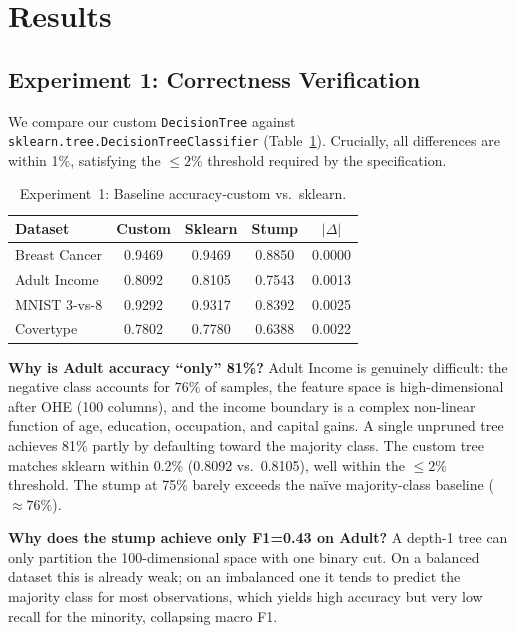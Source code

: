 \documentclass[conference]{IEEEtran}
\begin{document}
\section{Results}
\label{sec:results}

\subsection{Experiment 1: Correctness Verification}
\label{ssec:baseline}

We compare our custom \texttt{DecisionTree} against
\texttt{sklearn.tree.DecisionTreeClassifier} (Table~\ref{tab:baseline}).
Crucially, all differences are within 1\%, satisfying the $\le 2\%$
threshold required by the specification.

\begin{table}[h]
\centering
\caption{Experiment~1: Baseline accuracy-custom vs.\ sklearn.}
\label{tab:baseline}
\setlength{\tabcolsep}{4pt}
\begin{tabular}{lcccc}
\toprule
\textbf{Dataset} & \textbf{Custom} & \textbf{Sklearn} & \textbf{Stump} & $|\Delta|$\\
\midrule
Breast Cancer & 0.9469 & 0.9469 & 0.8850 & 0.0000\\
Adult Income  & 0.8092 & 0.8105 & 0.7543 & 0.0013\\
MNIST 3-vs-8  & 0.9292 & 0.9317 & 0.8392 & 0.0025\\
Covertype     & 0.7802 & 0.7780 & 0.6388 & 0.0022\\
\bottomrule
\end{tabular}
\end{table}

\textbf{Why is Adult accuracy ``only'' 81\%?}  Adult Income is
genuinely difficult: the negative class accounts for $76\%$ of
samples, the feature space is high-dimensional after OHE (100 columns),
and the income boundary is a complex non-linear function of age, education,
occupation, and capital gains.  A single unpruned tree achieves 81\%
partly by defaulting toward the majority class.  The custom tree
matches sklearn within 0.2\% (0.8092 vs.\ 0.8105), well within the
$\le 2\%$ threshold.  The stump at 75\%
barely exceeds the na\"ive majority-class baseline ($\approx76\%$).

\textbf{Why does the stump achieve only F1=0.43 on Adult?}  A depth-1
tree can only partition the 100-dimensional space with one binary cut.
On a balanced dataset this is already weak; on an imbalanced one it
tends to predict the majority class for most observations, which
yields high accuracy but very low recall for the minority, collapsing
macro F1.
\end{document}

